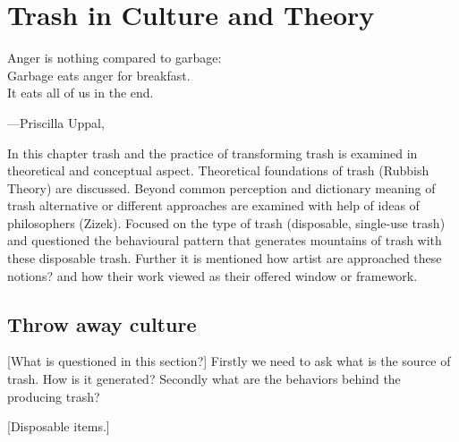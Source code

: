 \chapter{Trash in Culture and Theory}





\epigraph{Anger is nothing compared to garbage:\\ Garbage eats anger for breakfast.\\ It eats all of us in the end.}{\hfill---Priscilla Uppal, }





%
%
In this chapter trash and the practice of transforming trash is examined in theoretical and conceptual aspect. Theoretical foundations of trash (Rubbish Theory) are discussed. Beyond common perception and dictionary meaning of trash alternative or different approaches are examined with help of ideas of philosophers (Zizek). Focused on the type of trash (disposable, single-use trash) and questioned the behavioural pattern that generates mountains of trash with these disposable trash. Further it is mentioned how artist are approached these notions? and how their work viewed as their offered window or framework.





%
%
\section{Throw away culture}
[What is questioned in this section?] Firstly we need to ask what is the source of trash. How is it generated? Secondly what are the behaviors behind the producing trash?





%
%
[Disposable items.]    


